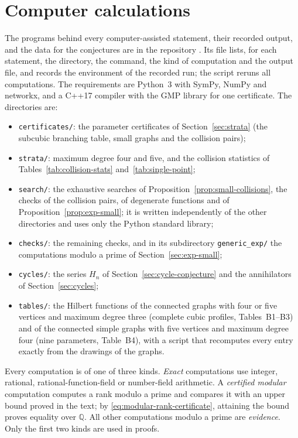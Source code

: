 \documentclass[reqno]{article}
\theoremstyle{plain} %
\theoremstyle{definition}
\theoremstyle{remark}
\numberwithin{equation}{section}
\begin{document}
\appendix
\section{Computer calculations}
\label{app:certificates}

The programs behind every computer-assisted statement, their recorded
output, and the data for the conjectures are in the repository
\cite{Cert}. Its file  lists, for each statement, the
directory, the command, the kind of computation and the output file, and
records the environment of the recorded run; the script
 reruns all computations. The requirements are Python~3
with SymPy, NumPy and networkx, and a C++17 compiler with the GMP library
for one certificate. The directories are:
\begin{itemize}
\item \texttt{certificates/}: the parameter certificates of
Section~\ref{sec:strata} (the subcubic branching table, small graphs and
the collision pairs);
\item \texttt{strata/}: maximum degree four and five, and the collision
statistics of Tables~\ref{tab:collision-stats}
and~\ref{tab:single-point};
\item \texttt{search/}: the exhaustive searches of
Proposition~\ref{prop:small-collisions}, the checks of the collision
pairs, of degenerate functions and of Proposition~\ref{prop:exp-small};
it is written independently of the other directories and uses only the
Python standard library;
\item \texttt{checks/}: the remaining checks, and in its subdirectory
\texttt{generic\_exp/} the computations modulo a prime of
Section~\ref{sec:exp-small};
\item \texttt{cycles/}: the series $H_n$ of Section~\ref{sec:cycle-conjecture}
and the annihilators of Section~\ref{sec:cycles};
\item \texttt{tables/}: the Hilbert functions of the connected graphs
with four or five vertices and maximum degree three (complete cubic
profiles, Tables~B1--B3) and of the connected simple graphs with five
vertices and maximum degree four (nine parameters, Table~B4), with a
script that recomputes every entry exactly from the drawings of the
graphs.
\end{itemize}

Every computation is of one of three kinds. \emph{Exact} computations use
integer, rational, rational-function-field or number-field arithmetic.
A \emph{certified modular} computation computes a rank modulo a prime and
compares it with an upper bound proved in the text; by
\eqref{eq:modular-rank-certificate}, attaining the bound proves equality
over $\mathbb Q$. All other computations modulo a prime are
\emph{evidence}. Only the first two kinds are used in proofs.
\end{document}
